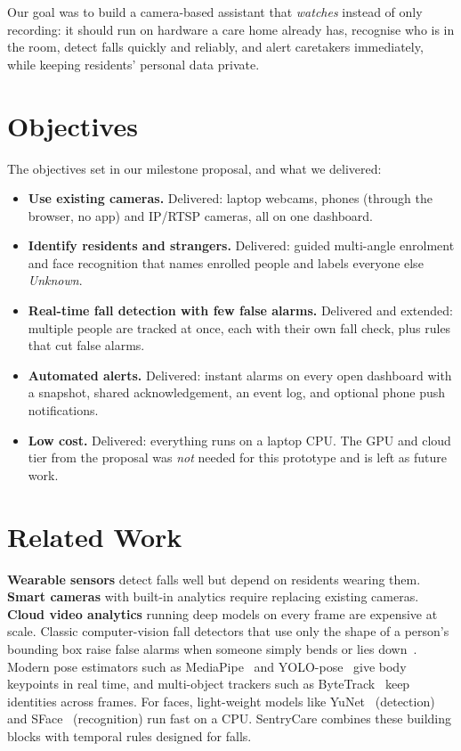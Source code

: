 \documentclass[11pt,a4paper]{article}
\begin{document}
Our goal was to build a camera-based assistant that \emph{watches} instead of only recording:
it should run on hardware a care home already has, recognise who is in the room, detect falls quickly and reliably,
and alert caretakers immediately, while keeping residents' personal data private.

\section{Objectives}

The objectives set in our milestone proposal, and what we delivered:

\begin{itemize}[leftmargin=*]
  \item \textbf{Use existing cameras.} Delivered: laptop webcams, phones (through the browser, no app) and IP/RTSP cameras,
        all on one dashboard.
  \item \textbf{Identify residents and strangers.} Delivered: guided multi-angle enrolment and face recognition that
        names enrolled people and labels everyone else \emph{Unknown}.
  \item \textbf{Real-time fall detection with few false alarms.} Delivered and extended: multiple people are tracked at
        once, each with their own fall check, plus rules that cut false alarms.
  \item \textbf{Automated alerts.} Delivered: instant alarms on every open dashboard with a snapshot, shared
        acknowledgement, an event log, and optional phone push notifications.
  \item \textbf{Low cost.} Delivered: everything runs on a laptop CPU. The GPU and cloud tier from the proposal was
        \emph{not} needed for this prototype and is left as future work.
\end{itemize}

\section{Related Work}

\textbf{Wearable sensors} detect falls well but depend on residents wearing them. \textbf{Smart cameras} with built-in
analytics require replacing existing cameras. \textbf{Cloud video analytics} running deep models on every frame are
expensive at scale. Classic computer-vision fall detectors that use only the shape of a person's bounding box raise
false alarms when someone simply bends or lies down~\cite{kwolek2014}. Modern pose estimators such as
MediaPipe~\cite{lugaresi2019} and YOLO-pose~\cite{yolo11} give body keypoints in real time, and multi-object trackers
such as ByteTrack~\cite{bytetrack} keep identities across frames. For faces, light-weight models like
YuNet~\cite{yunet} (detection) and SFace~\cite{sface} (recognition) run fast on a CPU. SentryCare combines these
building blocks with temporal rules designed for falls.
\end{document}
